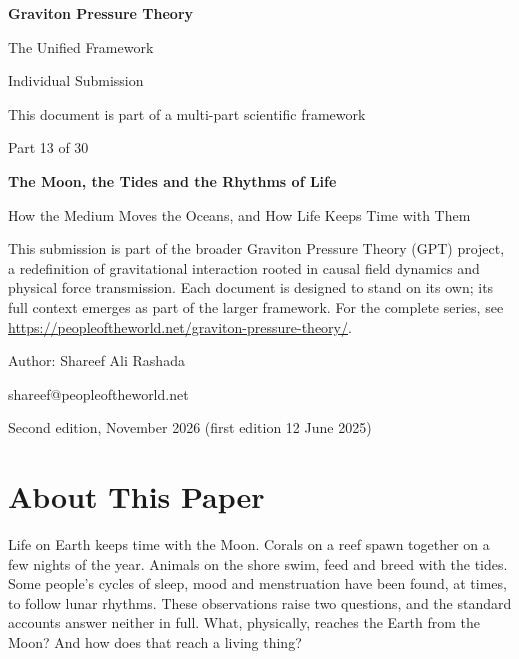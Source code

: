 \documentclass[11pt,a4paper]{article}
\begin{document}
\renewcommand{\thetable}{13.\arabic{table}}
\begin{titlepage}
\centering
\vspace*{1.5cm}
{\Huge\bfseries Graviton Pressure Theory\par}
\vspace{0.4cm}
{\Large The Unified Framework\par}
{\large Individual Submission\par}
\vspace{0.3cm}
{\normalsize This document is part of a multi-part scientific framework\par}
\vspace{1.6cm}
{\large Part 13 of 30\par}
\vspace{0.6cm}
{\huge\bfseries The Moon, the Tides and the Rhythms of Life\par}
\vspace{0.5cm}
{\Large How the Medium Moves the Oceans, and How Life Keeps Time with Them\par}
\vspace{1.4cm}
\begin{minipage}{0.82\textwidth}\centering\small
This submission is part of the broader Graviton Pressure Theory (GPT) project, a redefinition of gravitational interaction rooted in causal field dynamics and physical force transmission. Each document is designed to stand on its own; its full context emerges as part of the larger framework. For the complete series, see \url{https://peopleoftheworld.net/graviton-pressure-theory/}.
\end{minipage}
\vfill
{\large Author: Shareef Ali Rashada\par}
{\normalsize shareef@peopleoftheworld.net\par}
\vspace{0.3cm}
{\normalsize Second edition, November 2026 \quad (first edition 12 June 2025)\par}
\end{titlepage}

\tableofcontents
\newpage

\section*{About This Paper}

Life on Earth keeps time with the Moon. Corals on a reef spawn together on a few nights of the year. Animals on the shore swim, feed and breed with the tides. Some people's cycles of sleep, mood and menstruation have been found, at times, to follow lunar rhythms. These observations raise two questions, and the standard accounts answer neither in full. What, physically, reaches the Earth from the Moon? And how does that reach a living thing?
\end{document}
